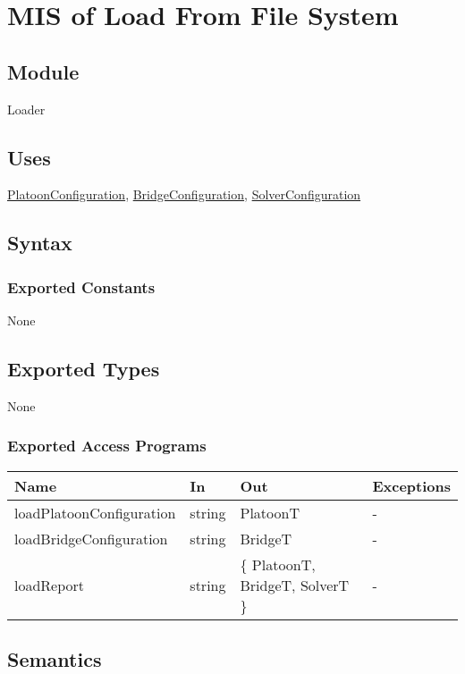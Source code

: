 \documentclass[12pt, titlepage]{article}
\begin{document}
\section{MIS of Load From File System}

\subsection{Module}\label{Loader} 

Loader

\subsection{Uses}
\hyperref[PlatoonConfiguration]{PlatoonConfiguration}, \hyperref[BridgeConfiguration]{BridgeConfiguration}, \hyperref[SolverConfiguration]{SolverConfiguration}

\subsection{Syntax}

\subsubsection{Exported Constants}
None
\subsection{Exported Types}
None
\subsubsection{Exported Access Programs}
\begin{center}
\begin{tabular}{p{5cm} p{3cm} p{3cm} p{1cm}}
\hline
\textbf{Name} & \textbf{In} & \textbf{Out} & \textbf{Exceptions} \\
\hline
loadPlatoonConfiguration & string & PlatoonT & - \\
\hline
loadBridgeConfiguration & string & BridgeT & - \\
\hline
loadReport & string & \{ PlatoonT, BridgeT, SolverT \} & - \\
\hline
\end{tabular}
\end{center}

\subsection{Semantics}
\end{document}

